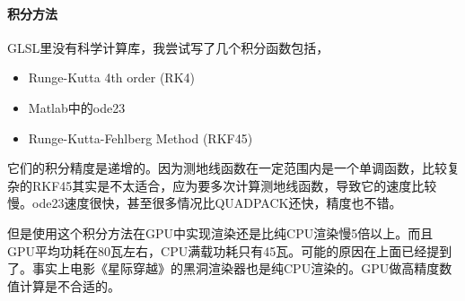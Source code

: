 \paragraph{积分方法}
GLSL里没有科学计算库，我尝试写了几个积分函数包括，
\begin{itemize}
    \item Runge-Kutta 4th order (RK4)
    \item Matlab中的ode23\cite{ode23}
    \item Runge-Kutta-Fehlberg Method (RKF45)\cite{numerical_methods_matlab}
\end{itemize}
它们的积分精度是递增的。因为测地线函数在一定范围内是一个单调函数，比较复杂的RKF45其实是不太适合，应为要多次计算测地线函数，导致它的速度比较慢。ode23速度很快，甚至很多情况比QUADPACK还快，精度也不错。

但是使用这个积分方法在GPU中实现渲染还是比纯CPU渲染慢5倍以上。而且GPU平均功耗在80瓦左右，CPU满载功耗只有45瓦。可能的原因在上面已经提到了。事实上电影《星际穿越》的黑洞渲染器也是纯CPU渲染的\cite{james_gravitational_2015}。GPU做高精度数值计算是不合适的。
